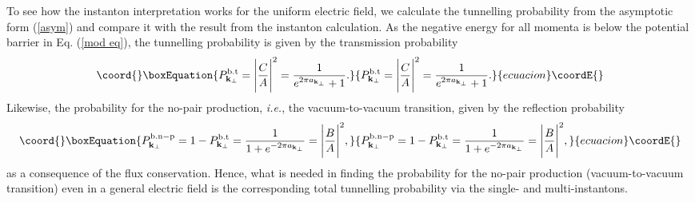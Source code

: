 \documentclass[a4paper,prd,showpacs,preprintnumbers,amsmath,amssymb]{revtex4}
\begin{document}
To see how the instanton interpretation works for the uniform
electric field, we calculate the tunnelling probability from the
asymptotic form (\ref{asym}) and compare it with the result from
the instanton calculation. As the negative energy for all momenta
\coordHE{} is below the potential barrier in Eq. (\ref{mod
eq}), the tunnelling probability is given by the transmission
probability
\begin{equation}\coord{}\boxEquation{
P^{\rm b.t}_{{\bf k}_{\perp}} = \Biggl|\frac{C}{A} \Biggr|^2 =
\frac{1}{e^{2 \pi a_{{\bf k}_{\perp}}} + 1}. \label{tun}
}{
P^{\rm b.t}_{{\bf k}_{\perp}} = \Biggl|\frac{C}{A} \Biggr|^2 =
\frac{1}{e^{2 \pi a_{{\bf k}_{\perp}}} + 1}. }{ecuacion}\coordE{}\end{equation}
Likewise, the probability for the no-pair production, {\it i.e.},
the vacuum-to-vacuum transition, given by the reflection
probability
\begin{equation}\coord{}\boxEquation{
P^{\rm b.n-p}_{{\bf k}_{\perp}} = 1 - P^{\rm b.t}_{{\bf
k}_{\perp}} = \frac{1}{1 + e^{ - 2 \pi a_{{\bf k}_{\perp}}}} =
\Biggl|\frac{B}{A} \Biggr|^2, \label{ref}
}{
P^{\rm b.n-p}_{{\bf k}_{\perp}} = 1 - P^{\rm b.t}_{{\bf
k}_{\perp}} = \frac{1}{1 + e^{ - 2 \pi a_{{\bf k}_{\perp}}}} =
\Biggl|\frac{B}{A} \Biggr|^2, }{ecuacion}\coordE{}\end{equation}
as a consequence of the flux conservation. Hence, what is needed
in finding the probability for the no-pair production
(vacuum-to-vacuum transition) even in a general electric field is
the corresponding total tunnelling probability via the single- and
multi-instantons.
\end{document}
